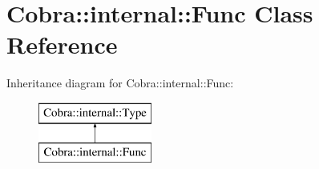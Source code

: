 \hypertarget{class_cobra_1_1internal_1_1_func}{\section{Cobra\+:\+:internal\+:\+:Func Class Reference}
\label{class_cobra_1_1internal_1_1_func}
}
Inheritance diagram for Cobra\+:\+:internal\+:\+:Func\+:\begin{figure}[H]
\begin{center}
\leavevmode
\includegraphics[height=2.000000cm]{class_cobra_1_1internal_1_1_func}
\end{center}
\end{figure}
